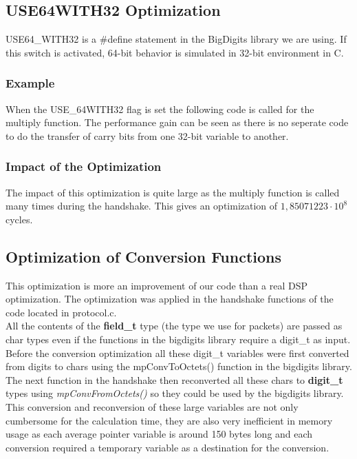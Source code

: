 \documentclass[a4paper]{article}
\begin{document}
\subsection{USE64WITH32 Optimization}
USE64\_WITH32 is a $\#$define statement in the BigDigits library we are using. If this switch is activated, 64-bit behavior is simulated in 32-bit environment in C.

\subsubsection{Example}
When the USE\_64WITH32 flag is set the following code is called for the multiply function. The performance gain can be seen as there is no seperate code to do the transfer of carry bits from one 32-bit variable to another.



\subsubsection{Impact of the Optimization}
The impact of this optimization is quite large as the multiply function is called many times during the handshake. This gives an optimization of $1,85071223\cdot10^{8}$ cycles.

\subsection{Optimization of Conversion Functions}
This optimization is more an improvement of our code than a real DSP optimization. The optimization was applied in the handshake functions of the code located in protocol.c.\\

All the contents of the \textbf{field\_t} type (the type we use for packets) are passed as char types even if the functions in the bigdigits library require a digit\_t as input. Before the conversion optimization all these digit\_t variables were first converted from digits to chars using the mpConvToOctets() function in the bigdigits library. The next function in the handshake then reconverted all these chars to \textbf{digit\_t} types using \textit{mpConvFromOctets()} so they could be used by the bigdigits library.\\

This conversion and reconversion of these large variables are not only cumbersome for the calculation time, they are also very inefficient in memory usage as each average pointer variable is around 150 bytes long and each conversion required a temporary variable as a destination for the conversion.\\
\end{document}
